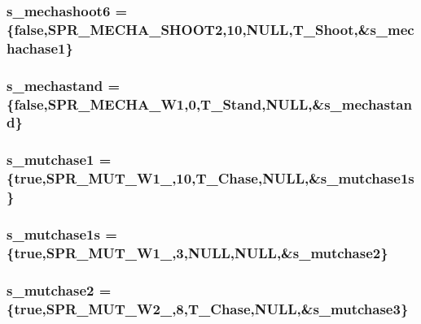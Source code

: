 \label{WL__ACT2_8C_a759fd366c222fc6c47d1f0462078f03c}
\hypertarget{WL__ACT2_8C_a90feaf399c73db25e839142d6c61a84c}{
\subsubsection[{s\_\-mechashoot6}]{ {\bf s\_\-mechashoot6} = \{false,SPR\_\-MECHA\_\-SHOOT2,10,NULL,T\_\-Shoot,\&{\bf s\_\-mechachase1}\}}}
\label{WL__ACT2_8C_a90feaf399c73db25e839142d6c61a84c}
\hypertarget{WL__ACT2_8C_a5cf381f84bbe8290df9af2682c9c03b8}{
\subsubsection[{s\_\-mechastand}]{ {\bf s\_\-mechastand} = \{false,SPR\_\-MECHA\_\-W1,0,T\_\-Stand,NULL,\&{\bf s\_\-mechastand}\}}}
\label{WL__ACT2_8C_a5cf381f84bbe8290df9af2682c9c03b8}
\hypertarget{WL__ACT2_8C_a5ee8dc5541dc82612a2a7e5ea048fa00}{
\subsubsection[{s\_\-mutchase1}]{ {\bf s\_\-mutchase1} = \{true,SPR\_\-MUT\_\-W1\_,10,T\_\-Chase,NULL,\&{\bf s\_\-mutchase1s}\}}}
\label{WL__ACT2_8C_a5ee8dc5541dc82612a2a7e5ea048fa00}
\hypertarget{WL__ACT2_8C_a9689e01ad9626ffb266e40ecf445fcd9}{
\subsubsection[{s\_\-mutchase1s}]{ {\bf s\_\-mutchase1s} = \{true,SPR\_\-MUT\_\-W1\_,3,NULL,NULL,\&{\bf s\_\-mutchase2}\}}}
\label{WL__ACT2_8C_a9689e01ad9626ffb266e40ecf445fcd9}
\hypertarget{WL__ACT2_8C_a001bae6f55f368c65e5babfd3469357b}{
\subsubsection[{s\_\-mutchase2}]{ {\bf s\_\-mutchase2} = \{true,SPR\_\-MUT\_\-W2\_,8,T\_\-Chase,NULL,\&{\bf s\_\-mutchase3}\}}}
